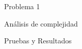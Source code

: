 \begin{section}{Problema 1}
\begin{subsection}{Análisis de complejidad}
	
	\end{subsection}


	\begin{subsection}{Pruebas y Resultados}

	\end{subsection}

\end{section}

